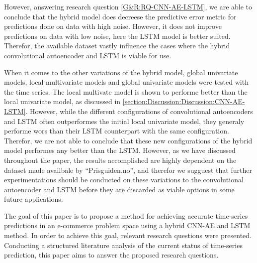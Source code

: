 However, answering research question \cref{G&R:RQ-CNN-AE-LSTM}, we are able to conclude that the hybrid model does
decreese the predictive error metric for predictions done on data with high noise.
However, it does not improve predictions on data with low noise, here the LSTM model is better suited.
Therefor, the available dataset vastly influence the cases where the hybrid convolutional autoencoder and LSTM is viable for use.

When it comes to the other variations of the hybrid model, global univariate models,
local multivariate models and global univariate models were tested with the time series.
The local multivate model is shown to performe better than the local univariate model, as discussed in \cref{section:Discussion:Discussion:CNN-AE-LSTM}.
However, while the different configurations of convolutional autoencoders and LSTM often outperformes the initial local univariate model,
they generaly performe wors than their LSTM counterpart with the same configuration.
Therefor, we are not able to conclude that these new configurations of the hybrid model performes any better than the LSTM.
However, as we have discussed throughout the paper, the results accomplished are highly dependent on the dataset made availbale by ``Prisguiden.no'',
and therefor we sugguest that further experimentations should be conducted on these variations to the convolutional autoencoder and LSTM
before they are discarded as viable options in some future applications.







\iffalse
  The goal of this paper is to propose a method for achieving accurate time-series predictions in an e-commerce
  problem space using a hybrid CNN-AE and LSTM method.
  In order to achieve this goal, relevant research questions were presented.
  Conducting a structured literature analysis of the current status of time-series prediction,
  this paper aims to answer the proposed research questions.

